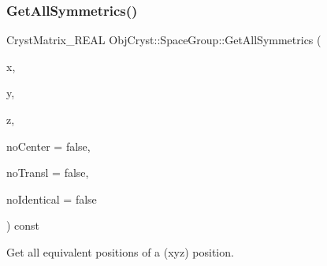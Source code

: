 \subsubsection{\texorpdfstring{GetAllSymmetrics()}{GetAllSymmetrics()}}
{\footnotesize\ttfamily Cryst\+Matrix\+\_\+\+R\+E\+AL Obj\+Cryst\+::\+Space\+Group\+::\+Get\+All\+Symmetrics (\begin{DoxyParamCaption}\item[{const R\+E\+AL}]{x,  }\item[{const R\+E\+AL}]{y,  }\item[{const R\+E\+AL}]{z,  }\item[{const bool}]{no\+Center = {\ttfamily false},  }\item[{const bool}]{no\+Transl = {\ttfamily false},  }\item[{const bool}]{no\+Identical = {\ttfamily false} }\end{DoxyParamCaption}) const}



Get all equivalent positions of a (xyz) position. 


